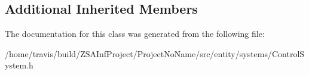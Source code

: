 \subsection*{Additional Inherited Members}


The documentation for this class was generated from the following file\-:\begin{DoxyCompactItemize}
\item 
/home/travis/build/\-Z\-S\-A\-Inf\-Project/\-Project\-No\-Name/src/entity/systems/Control\-System.\-h\end{DoxyCompactItemize}
